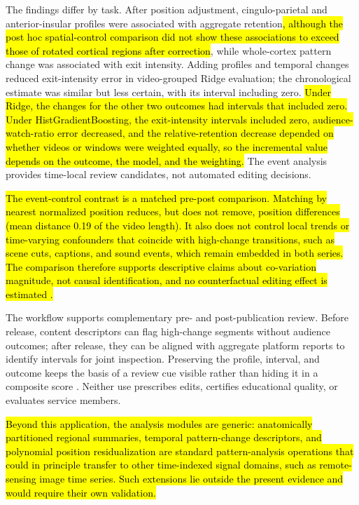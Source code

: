 \documentclass{ieeeaccess}
\newcommand{\rev}[1]{\hl{#1}}
\newcommand{\rev}[1]{#1}
\begin{document}
The findings differ by task. After position adjustment, cingulo-parietal and anterior-insular profiles were associated with aggregate retention\rev{, although the post hoc spatial-control comparison did not show these associations to exceed those of rotated cortical regions after correction}, while whole-cortex pattern change was associated with exit intensity. Adding profiles and temporal changes reduced exit-intensity error in video-grouped Ridge evaluation; the chronological estimate was similar but less certain, with its interval including zero. \rev{Under Ridge, the changes for the other two outcomes had intervals that included zero. Under HistGradientBoosting, the exit-intensity intervals included zero, audience-watch-ratio error decreased, and the relative-retention decrease depended on whether videos or windows were weighted equally, so the incremental value depends on the outcome, the model, and the weighting.} The event analysis provides time-local review candidates, not automated editing decisions.

\rev{The event-control contrast is a matched pre-post comparison. Matching by nearest normalized position reduces, but does not remove, position differences (mean distance 0.19 of the video length). It also does not control local trends or time-varying confounders that coincide with high-change transitions, such as scene cuts, captions, and sound events, which remain embedded in both series. The comparison therefore supports descriptive claims about co-variation magnitude, not causal identification, and no counterfactual editing effect is estimated \mbox{\cite{bertrand2004did,yarkoni2017prediction}}.}

The workflow supports complementary pre- and post-publication review. Before release, content descriptors can flag high-change segments without audience outcomes; after release, they can be aligned with aggregate platform reports to identify intervals for joint inspection. Preserving the profile, interval, and outcome keeps the basis of a review cue visible rather than hiding it in a composite score \cite{nardo2005composite}. Neither use prescribes edits, certifies educational quality, or evaluates service members.

\rev{Beyond this application, the analysis modules are generic: anatomically partitioned regional summaries, temporal pattern-change descriptors, and polynomial position residualization are standard pattern-analysis operations that could in principle transfer to other time-indexed signal domains, such as remote-sensing image time series. Such extensions lie outside the present evidence and would require their own validation.}
\end{document}
